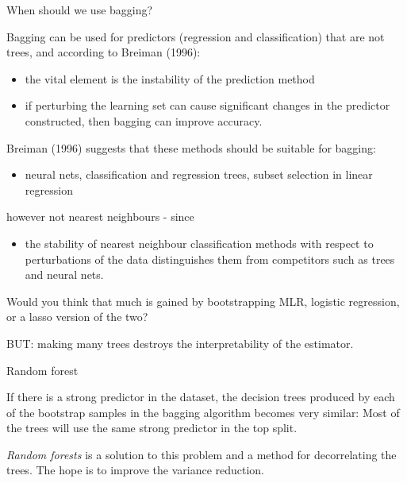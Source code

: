 \documentclass[
  ignorenonframetext,
]{beamer}
\providecommand{\tightlist}{%
  \setlength{\itemsep}{0pt}\setlength{\parskip}{0pt}}
\begin{document}
\begin{frame}

\begin{block}{When should we use bagging?}

Bagging can be used for predictors (regression and classification) that
are not trees, and according to Breiman (1996):

\begin{itemize}
\tightlist
\item
  the vital element is the instability of the prediction method
\item
  if perturbing the learning set can cause significant changes in the
  predictor constructed, then bagging can improve accuracy.
\end{itemize}

Breiman (1996) suggests that these methods should be suitable for
bagging:

\begin{itemize}
\tightlist
\item
  neural nets, classification and regression trees, subset selection in
  linear regression
\end{itemize}

however not nearest neighbours - since

\begin{itemize}
\tightlist
\item
  the stability of nearest neighbour classification methods with respect
  to perturbations of the data distinguishes them from competitors such
  as trees and neural nets.
\end{itemize}

Would you think that much is gained by bootstrapping MLR, logistic
regression, or a lasso version of the two?

BUT: making many trees destroys the interpretability of the estimator.

\end{block}

\end{frame}

\begin{frame}{Random forest}
\protect\hypertarget{random-forest}{}

If there is a strong predictor in the dataset, the decision trees
produced by each of the bootstrap samples in the bagging algorithm
becomes very similar: Most of the trees will use the same strong
predictor in the top split.

\emph{Random forests} is a solution to this problem and a method for
decorrelating the trees. The hope is to improve the variance reduction.

\end{frame}
\end{document}
